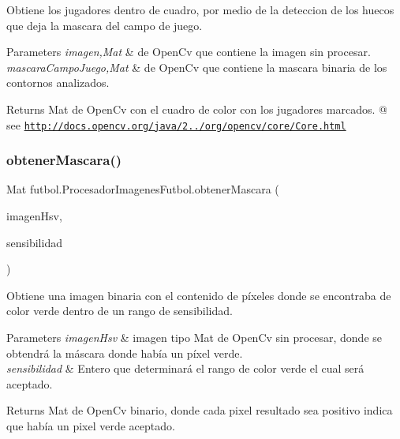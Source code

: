 Obtiene los jugadores dentro de cuadro, por medio de la deteccion de los huecos que deja la mascara del campo de juego. 
\begin{DoxyParams}{Parameters}
{\em imagen,Mat} & de Open\+Cv que contiene la imagen sin procesar. \\
\hline
{\em mascara\+Campo\+Juego,Mat} & de Open\+Cv que contiene la mascara binaria de los contornos analizados. \\
\hline
\end{DoxyParams}
\begin{DoxyReturn}{Returns}
Mat de Open\+Cv con el cuadro de color con los jugadores marcados. @ see \href{http://docs.opencv.org/java/2.4.2/org/opencv/core/Core.html}{\tt http\+://docs.\+opencv.\+org/java/2../org/opencv/core/\+Core.\+html} 
\end{DoxyReturn}
\hypertarget{classfutbol_1_1_procesador_imagenes_futbol_a11c662ef58e106c19b0a2bdee7504292}{}\label{classfutbol_1_1_procesador_imagenes_futbol_a11c662ef58e106c19b0a2bdee7504292} 
\subsubsection{\texorpdfstring{obtener\+Mascara()}{obtenerMascara()}}
{\footnotesize\ttfamily Mat futbol.\+Procesador\+Imagenes\+Futbol.\+obtener\+Mascara (\begin{DoxyParamCaption}\item[{Mat}]{imagen\+Hsv,  }\item[{int}]{sensibilidad }\end{DoxyParamCaption})\hspace{0.3cm}{\ttfamily [private]}}

Obtiene una imagen binaria con el contenido de píxeles donde se encontraba de color verde dentro de un rango de sensibilidad. 
\begin{DoxyParams}{Parameters}
{\em imagen\+Hsv} & imagen tipo Mat de Open\+Cv sin procesar, donde se obtendrá la máscara donde había un píxel verde. \\
\hline
{\em sensibilidad} & Entero que determinará el rango de color verde el cual será aceptado. \\
\hline
\end{DoxyParams}
\begin{DoxyReturn}{Returns}
Mat de Open\+Cv binario, donde cada pixel resultado sea positivo indica que había un pixel verde aceptado. 
\end{DoxyReturn}
\hypertarget{classfutbol_1_1_procesador_imagenes_futbol_a2d329b8027ef8b42a322a437e0b1da84}{}\label{classfutbol_1_1_procesador_imagenes_futbol_a2d329b8027ef8b42a322a437e0b1da84} 
